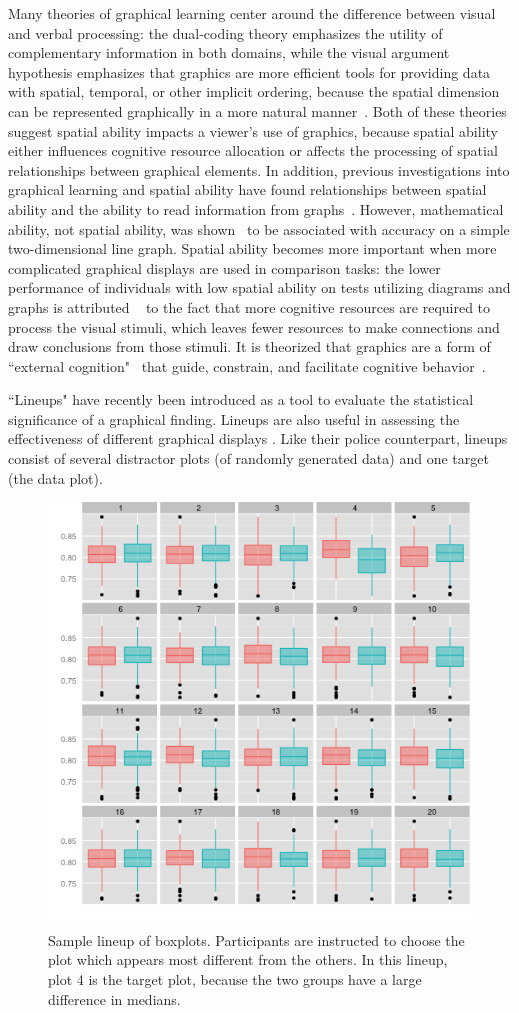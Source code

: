 \documentclass[11pt]{isuthesis}\usepackage[]{graphicx}\usepackage[]{color}
\begin{document}
Many theories of graphical learning center around the difference between visual and verbal processing: the dual-coding theory emphasizes the utility of complementary information in both domains, while the visual argument hypothesis emphasizes that graphics are more efficient tools for providing data with spatial, temporal, or other implicit ordering, because the spatial dimension can be represented graphically in a more natural manner~\citep{vekiri2002value}. Both of these theories suggest spatial ability impacts a viewer's use of graphics, because spatial ability either influences cognitive resource allocation or affects the processing of spatial relationships between graphical elements. In addition, previous investigations into graphical learning and spatial ability have found relationships between spatial ability and the ability to read information from graphs~\citep{lowrie2007solving}. 
However,  mathematical ability, not spatial ability, was shown~\citep{shah1995conceptual} to be associated with accuracy on a simple two-dimensional line graph. 
Spatial ability becomes more important when more complicated graphical displays are used in comparison tasks: the lower performance of individuals with low spatial ability on tests utilizing diagrams and graphs is attributed ~\citep{mayer1994whom} to the fact that more cognitive resources are required to process the visual stimuli, which leaves fewer resources to make connections and draw conclusions from those stimuli. It is theorized that graphics are a form of ``external cognition"~\citep{scaife1996external} that guide, constrain, and facilitate cognitive behavior~\citep{zhang1997nature}. 

``Lineups" have recently been introduced \citep{buja2009statistical, wickham2010graphical, majumder2013validation} as a tool to evaluate the statistical significance of a graphical finding. Lineups are also useful in assessing the effectiveness of different graphical displays \citep{hofmann2012graphical, loy:2015}. Like their police counterpart, lineups consist of several distractor plots (of randomly generated data) and one target (the data plot). 

\begin{figure}[htp]
\centering
\includegraphics[width=.5\linewidth]{lineup}
\caption[Sample Lineup]{Sample lineup of boxplots. Participants are instructed to choose the plot which appears most different from the others. In this lineup, plot 4 is the target plot, because the two groups have a large difference in medians.\label{fig:lineup}}
\end{figure}
\end{document}
